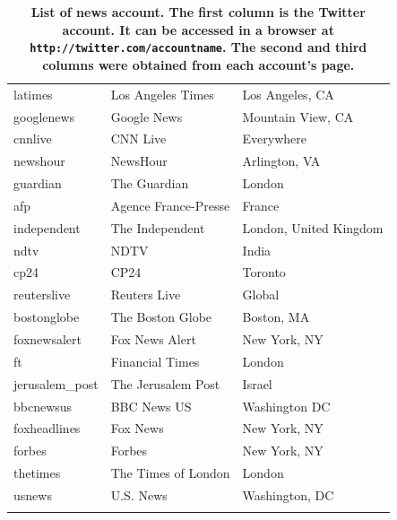 \documentclass[10pt,letterpaper]{article}
\begin{document}
{\begin{longtable}{lll}
    latimes          &  Los Angeles Times     &  Los Angeles, CA             \\
    googlenews       &  Google News           &  Mountain View, CA           \\
    cnnlive          &  CNN Live              &  Everywhere                  \\
    newshour         &  NewsHour              &  Arlington, VA               \\
    guardian         &  The Guardian          &  London                      \\
    afp              &  Agence France-Presse  &  France                      \\
    independent      &  The Independent       &  London, United Kingdom      \\
    ndtv             &  NDTV                  &  India                       \\
    cp24             &  CP24                  &  Toronto                     \\
    reuterslive      &  Reuters Live          &  Global                      \\
    bostonglobe      &  The Boston Globe      &  Boston, MA                  \\
    foxnewsalert     &  Fox News Alert        &  New York, NY                \\
    ft               &  Financial Times       &  London                      \\
    jerusalem\_post   &  The Jerusalem Post    &  Israel                      \\
    bbcnewsus        &  BBC News US           &  Washington DC               \\
    foxheadlines     &  Fox News              &  New York, NY                \\
    forbes           &  Forbes                &  New York, NY                \\
    thetimes         &  The Times of London   &  London                      \\
    usnews           &  U.S. News             &  Washington, DC\\

    \caption[List of news accounts.]{\textbf{List of news account. The
        first column is the Twitter account. It can be accessed in a
        browser at \texttt{http://twitter.com/accountname}. The second
        and third columns were obtained from each account's page.}}

\end{longtable}
}
\end{document}

